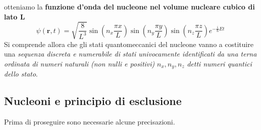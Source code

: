 otteniamo la \textbf{funzione d’onda del nucleone nel volume nucleare cubico di lato L}
\begin{equation}
	\psi(\bm{r},t) = \sqrt{ \frac{8}{L^{3}}} \sin\left( n_{x} \frac{\pi x}{L} \right) \sin\left( n_{y} \frac{\pi y}{L} \right)
	\sin\left( n_{z} \frac{\pi z}{L} \right) e^{ -\frac{i}{\hslash}Et }
	\label{eq:wave-function-nucleon-fermion-gas-normalized}
\end{equation}
Si comprende allora che gli stati quantomeccanici del nucleone vanno a costituire una \emph{sequenza discreta e numerabile di stati univocamente identificati da una terna ordinata di numeri naturali (non nulli e positivi)} $n_x, n_y, n_z$  \emph{detti numeri quantici dello stato}.

\subsection{Nucleoni e principio di esclusione} \label{sec:nucleoni-principio-di-esclusione}
%
%
%
%
Prima di proseguire sono necessarie alcune precisazioni.
